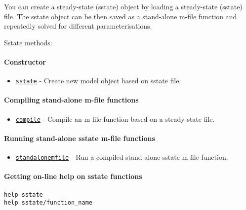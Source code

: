 

	You can create a steady-state (sstate) object by loading a steady-state
(sstate) file. The sstate object can be then saved as a stand-alone
m-file function and repeatedly solved for different parameterisations.

Sstate methods:

\paragraph{Constructor}\label{constructor}

\begin{itemize}
\itemsep1pt\parskip0pt
\item
  \href{sstate/sstate}{\texttt{sstate}} - Create new model object based
  on sstate file.
\end{itemize}

\paragraph{Compiling stand-alone m-file
functions}\label{compiling-stand-alone-m-file-functions}

\begin{itemize}
\itemsep1pt\parskip0pt
\item
  \href{sstate/compile}{\texttt{compile}} - Compile an m-file function
  based on a steady-state file.
\end{itemize}

\paragraph{Running stand-alone sstate m-file
functions}\label{running-stand-alone-sstate-m-file-functions}

\begin{itemize}
\itemsep1pt\parskip0pt
\item
  \href{sstate/standalonemfile}{\texttt{standalonemfile}} - Run a
  compiled stand-alone sstate m-file function.
\end{itemize}

\paragraph{Getting on-line help on sstate
functions}\label{getting-on-line-help-on-sstate-functions}

\begin{verbatim}
help sstate
help sstate/function_name
\end{verbatim}



